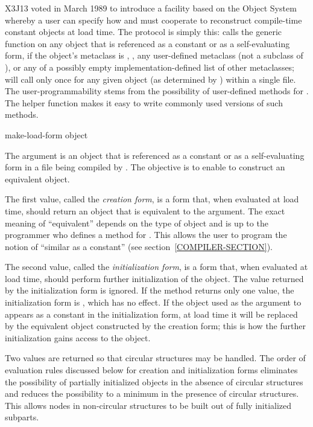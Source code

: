 \begin{newer}
X3J13 voted in March 1989  to introduce a facility
based on the Object System
whereby a user can specify how  and 
must cooperate to reconstruct compile-time constant objects at load time.
The protocol is simply this:
   calls the generic
  function  on any object that is referenced as
  a constant or as a self-evaluating form, if the object's metaclass is
  , , any user-defined metaclass (not a
  subclass of ), or any of a possibly empty
  implementation-defined list of other metaclasses;  will
  call  only once for any given object (as determined by )
  within a single file.  The user-programmability stems from the possibility
  of user-defined methods for .  The helper function
   makes it easy to write commonly used
  versions of such methods.

\begin{defun}
make-load-form object

The argument is an object that is
  referenced as a constant or as a self-evaluating form in a file being
  compiled by .  The objective is to enable  to
  construct an equivalent object.

  The first value, called the {\it creation form}, is a form that, when
  evaluated at load time, should return an object that is equivalent to
  the argument.  The exact meaning of ``equivalent'' depends on the type
  of object and is up to the programmer who defines a method for
  .  This allows the user to program the notion
  of ``similar as a constant'' (see section~\ref{COMPILER-SECTION}).

  The second value, called the {\it initialization form}, is a form that,
  when evaluated at load time, should perform further initialization of
  the object.  The value returned by the initialization form is ignored.
  If the  method returns only one value, the
  initialization form is , which has no effect.  If the object used
  as the argument to  appears as a constant in the
  initialization form, at load time it will be replaced by the
  equivalent object constructed by the creation form; this is how the
  further initialization gains access to the object.

  Two values are returned so that circular structures may be handled.
  The order of evaluation rules discussed below
  for creation and initialization forms
  eliminates the possibility of partially initialized objects in the
  absence of circular structures and reduces the possibility to a minimum
  in the presence of circular structures.  This allows nodes in
  non-circular structures to be built out of fully initialized subparts.


\end{defun}
\end{newer}
